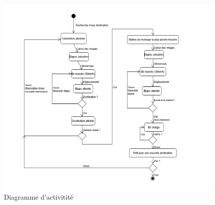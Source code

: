 \documentclass[conference]{IEEEtran}
\begin{document}
\begin{figure}[h!]
    \hspace{-7em}
    \includegraphics[width=1.35\linewidth]{activity.PNG}
    \caption{Diagramme d'activitité}
    \label{fig:activity}
\end{figure}
\end{document}
